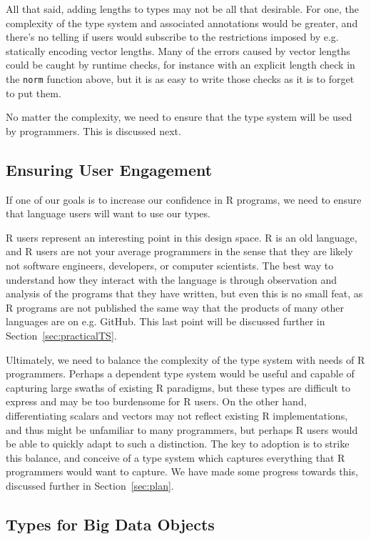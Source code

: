 \documentclass[sigplan,10pt,review]{acmart}\settopmatter{printfolios=true,printccs=false,printacmref=false}
\begin{document}
All that said, adding lengths to types may not be all that desirable.
For one, the complexity of the type system and associated annotations would be greater, and there's no telling if users would subscribe to the restrictions imposed by e.g. statically encoding vector lengths.
Many of the errors caused by vector lengths could be caught by runtime checks, for instance with an explicit length check in the {\tt norm} function above, but it is as easy to write those checks as it is to forget to put them.

No matter the complexity, we need to ensure that the type system will be used by programmers.
This is discussed next.

%
%
\subsection{Ensuring User Engagement}

If one of our goals is to increase our confidence in R programs, we need to ensure that language users will want to use our types.

R users represent an interesting point in this design space.
R is an old language, and R users are not your average programmers in the sense that they are likely not software engineers, developers, or computer scientists.
The best way to understand how they interact with the language is through observation and analysis of the programs that they have written, but even this is no small feat, as R programs are not published the same way that the products of many other languages are on e.g. GitHub.
This last point will be discussed further in Section~\ref{sec:practicalTS}.

Ultimately, we need to balance the complexity of the type system with needs of R programmers.
Perhaps a dependent type system would be useful and capable of capturing large swaths of existing R paradigms, but these types are difficult to express and may be too burdensome for R users. 
On the other hand, differentiating scalars and vectors may not reflect existing R implementations, and thus might be unfamiliar to many programmers, but perhaps R users would be able to quickly adapt to such a distinction.
The key to adoption is to strike this balance, and conceive of a type system which captures everything that R programmers would want to capture. 
We have made some progress towards this, discussed further in Section~\ref{sec:plan}.

%
%
\subsection{Types for Big Data Objects}
\end{document}
